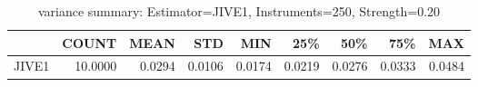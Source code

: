 \begin{table}[ht]
\centering
\caption{variance summary: Estimator=JIVE1, Instruments=250, Strength=0.20}
\begin{tabular}{lrrrrrrrr}
\toprule
 & COUNT & MEAN & STD & MIN & 25\% & 50\% & 75\% & MAX \\
\midrule
JIVE1 & 10.0000 & 0.0294 & 0.0106 & 0.0174 & 0.0219 & 0.0276 & 0.0333 & 0.0484 \\
\bottomrule
\end{tabular}
\end{table}
